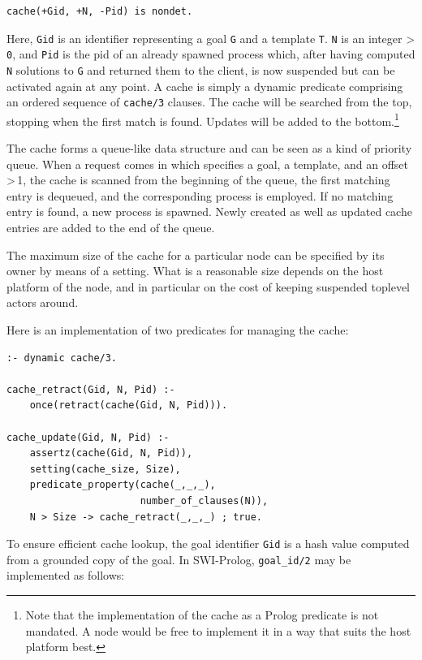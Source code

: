 \begin{verbatim}
cache(+Gid, +N, -Pid) is nondet.
\end{verbatim}

\noindent Here, \texttt{Gid} is an identifier representing a goal \texttt{G} and a template \texttt{T}. \texttt{N} is an integer \textgreater{} \texttt{0}, and \texttt{Pid} is the pid of an already spawned process which, after having computed \texttt{N} solutions to \texttt{G} and returned them to the client, is now suspended but can be activated again at any point. A cache is simply a dynamic predicate comprising an ordered sequence of \texttt{cache/3} clauses. The cache will be searched from the top, stopping when the first match is found. Updates will be added to the bottom.\footnote{Note that the implementation of the cache as a Prolog predicate is not mandated. A node would be free to implement it in a way that suits the host platform best.}

The cache forms a queue-like data structure and can be seen as a kind of priority queue. When a request comes in which specifies a goal, a template, and an offset\,>\,1, the cache is scanned from the beginning of the queue, the first matching entry is dequeued, and the corresponding process is employed. If no matching entry is found, a new process is spawned. Newly created as well as updated cache entries are added to the end of the queue. 

The maximum size of the cache for a particular node can be
specified by its owner by means of a setting. What is a reasonable size
depends on the host platform of the node, and in particular on the cost
of keeping suspended toplevel actors around. %

Here is an implementation of two predicates for managing the cache:

\begin{verbatim}
:- dynamic cache/3.

cache_retract(Gid, N, Pid) :-
    once(retract(cache(Gid, N, Pid))).

cache_update(Gid, N, Pid) :-
    assertz(cache(Gid, N, Pid)),
    setting(cache_size, Size),
    predicate_property(cache(_,_,_),
                       number_of_clauses(N)),
    N > Size -> cache_retract(_,_,_) ; true.
\end{verbatim}

\noindent To ensure efficient cache lookup, the goal identifier \texttt{Gid} is a hash value computed from a grounded copy of the goal. In SWI-Prolog, \texttt{goal\_id/2} may be implemented as follows:

